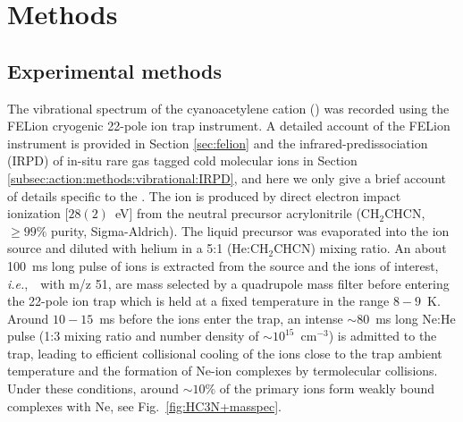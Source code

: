 \section{Methods}
\subsection{Experimental methods}
\label{sec:experiment}
The vibrational spectrum of the cyanoacetylene cation (\ion) was recorded using the FELion cryogenic 22-pole ion trap instrument. A detailed account of the FELion instrument is provided in Section \ref{sec:felion} and the infrared-predissociation (IRPD) of in-situ rare gas tagged cold molecular ions in Section \ref{subsec:action:methods:vibrational:IRPD}, and here we only give a brief account of details specific to the \iont. The ion is produced by direct electron impact ionization [$28(2)$~eV] from the neutral precursor acrylonitrile (CH$_2$CHCN, $ \ge 99\%$ purity, Sigma-Aldrich). The liquid precursor was evaporated into the ion source and diluted with helium in a 5:1 (He:CH$_2$CHCN) mixing ratio. An about 100~ms long pulse of ions is extracted from the source and the ions of interest, {\em i.e.},\ \ion\ with m/z 51, are mass selected by a quadrupole mass filter before entering the 22-pole ion trap which is held at a fixed temperature in the range $8-9$~K.  Around $10-15$~ms before the ions enter the trap, an intense $\sim$80~ms long Ne:He pulse (1:3 mixing ratio and number density of $\sim 10^{15}$~cm$^{-3}$) is admitted to the trap, leading to efficient collisional cooling of the ions close to the trap ambient temperature and the formation of Ne-ion complexes by termolecular collisions. Under these conditions, around $\sim 10 \%$ of the primary ions form weakly bound complexes with Ne, see Fig.~\ref{fig:HC3N+masspec}.

